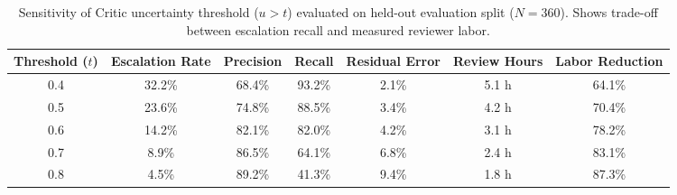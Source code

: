 
\begin{table}[t]
\centering
\small
\caption{Sensitivity of Critic uncertainty threshold ($u > t$) evaluated on held-out evaluation split ($N=360$). Shows trade-off between escalation recall and measured reviewer labor.}
\label{tab:critic_threshold_sensitivity}
\begin{tabular}{ccccccc}
\toprule
\textbf{Threshold ($t$)} & \textbf{Escalation Rate} & \textbf{Precision} & \textbf{Recall} & \textbf{Residual Error} & \textbf{Review Hours} & \textbf{Labor Reduction} \\
\midrule
0.4 & 32.2\% & 68.4\% & 93.2\% & 2.1\% & 5.1 h & 64.1\% \\
0.5 & 23.6\% & 74.8\% & 88.5\% & 3.4\% & 4.2 h & 70.4\% \\
0.6 & 14.2\% & 82.1\% & 82.0\% & 4.2\% & 3.1 h & 78.2\% \\
0.7 & 8.9\% & 86.5\% & 64.1\% & 6.8\% & 2.4 h & 83.1\% \\
0.8 & 4.5\% & 89.2\% & 41.3\% & 9.4\% & 1.8 h & 87.3\% \\
\bottomrule
\end{tabular}
\end{table}

